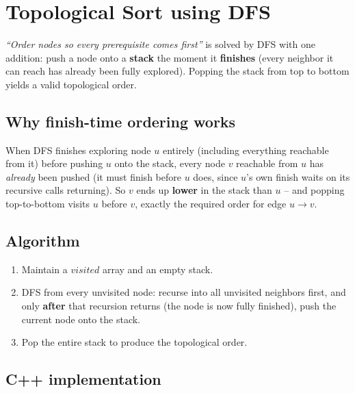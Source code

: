 \section{Topological Sort using DFS}
\label{sec:graph-topo-sort-dfs}


\begin{patternbox}
\emph{``Order nodes so every prerequisite comes first''} is solved by
DFS with one addition: push a node onto a \textbf{stack} the moment it
\textbf{finishes} (every neighbor it can reach has already been fully
explored). Popping the stack from top to bottom yields a valid
topological order.
\end{patternbox}

\subsection*{Why finish-time ordering works}

When DFS finishes exploring node $u$ entirely (including everything
reachable from it) before pushing $u$ onto the stack, every node $v$
reachable from $u$ has \emph{already} been pushed (it must finish
before $u$ does, since $u$'s own finish waits on its recursive calls
returning). So $v$ ends up \textbf{lower} in the stack than $u$ -- and
popping top-to-bottom visits $u$ before $v$, exactly the required
order for edge $u \to v$.

\subsection*{Algorithm}

\begin{enumerate}
  \item Maintain a $\textit{visited}$ array and an empty stack.
  \item DFS from every unvisited node: recurse into all unvisited
        neighbors first, and only \textbf{after} that recursion
        returns (the node is now fully finished), push the current
        node onto the stack.
  \item Pop the entire stack to produce the topological order.
\end{enumerate}

\subsection*{C++ implementation}

